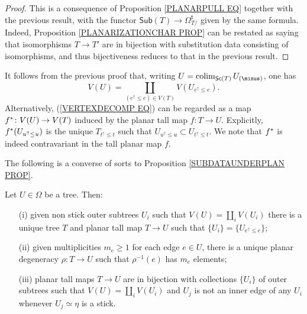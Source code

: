 \documentclass[a4paper,10pt]{article}%
\begin{document}
\begin{proof}
	This is a consequence of Proposition \ref{PLANARPULL EQ} together with the previous result, with the functor 
	$\mathsf{Sub}(T) \to \Omega_{T/}^{\mathsf{t}}$ given by the same formula.
	Indeed, Proposition \ref{PLANARIZATIONCHAR PROP} can be restated as saying that isomorphisms $T \to T'$ are in bijection with substitution data consisting of isomorphisms, and thus  bijectiveness reduces to that in the previous result.
\end{proof}


\begin{remark}\label{VERTEXDECOMP REM}
	It follows from the previous proof that, writing 
	$U = \colim_{\mathsf{Sc}(T)}U_{(\minus)}$,
	one has 
\begin{equation}\label{VERTEXDECOMP EQ}
	V(U) = \coprod_{(e^{\uparrow} \leq e) \in V(T)}
	V(U_{e^{\uparrow} \leq e}).
\end{equation}
Alternatively, (\ref{VERTEXDECOMP EQ}) can be regarded as a map 
$f^{\**} \colon V(U) \to V(T)$ induced by the planar tall map 
$f \colon T \to U$.
Explicitly, $f^{\**}(U_{u^{\uparrow} \leq u})$ 
is the unique $T_{t^{\uparrow}\leq t}$ such that
$U_{u^{\uparrow} \leq u} \subset U_{t^{\uparrow} \leq t}$. We note that $f^{\**}$ is indeed contravariant in the tall planar map $f$.
\end{remark}


The following is a converse of sorts to
 Proposition \ref{SUBDATAUNDERPLAN PROP}.

\begin{proposition}\label{BUILDABLE PROP}
	Let $U \in \Omega$ be a tree. Then:
\begin{itemize}
	\item[(i)] given non stick outer subtrees $U_i$ such that 
	$V(U) = \coprod_i V(U_i)$ there is a unique tree $T$ and planar tall map $T \to U$ such that $\{U_i\} = \{U_{e^{\uparrow}\leq e}\}$;
	\item[(ii)] given multiplicities $m_e \geq 1$ for each edge $e \in U$, there is a unique planar degeneracy $\rho \colon T \to U$ such that $\rho^{-1}(e)$ has $m_e$ elements;
	\item[(iii)] planar tall maps $T \to U$ are in bijection with collections $\{U_i\}$ of outer subtrees such that $V(U) = \coprod_i V(U_i)$ and $U_j$ is not an inner edge of any $U_i$ whenever $U_j \simeq \eta$ is a stick.
\end{itemize}
\end{proposition}
\end{document}
